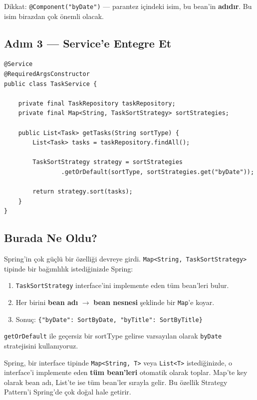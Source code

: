 \documentclass[11pt,a4paper]{article}
\begin{document}
Dikkat: \texttt{@Component("byDate")} --- parantez i\c{c}indeki isim, bu bean'in \textbf{ad{\i}d{\i}r}. Bu isim birazdan \c{c}ok \"{o}nemli olacak.

\subsection*{Ad{\i}m 3 --- Service'e Entegre Et}

\begin{lstlisting}[style=java]
@Service
@RequiredArgsConstructor
public class TaskService {

    private final TaskRepository taskRepository;
    private final Map<String, TaskSortStrategy> sortStrategies;

    public List<Task> getTasks(String sortType) {
        List<Task> tasks = taskRepository.findAll();

        TaskSortStrategy strategy = sortStrategies
                .getOrDefault(sortType, sortStrategies.get("byDate"));

        return strategy.sort(tasks);
    }
}
\end{lstlisting}

\subsection*{Burada Ne Oldu?}

Spring'in \c{c}ok g\"{u}\c{c}l\"{u} bir \"{o}zelli\u{g}i devreye girdi. \texttt{Map<String, TaskSortStrategy>} tipinde bir ba\u{g}{\i}ml{\i}l{\i}k istedi\u{g}inizde Spring:

\begin{enumerate}
    \item \texttt{TaskSortStrategy} interface'ini implemente eden t\"{u}m bean'leri bulur.
    \item Her birini \textbf{bean ad{\i}} $\rightarrow$ \textbf{bean nesnesi} \c{s}eklinde bir \texttt{Map}'e koyar.
    \item Sonu\c{c}: \texttt{\{"byDate": SortByDate, "byTitle": SortByTitle\}}
\end{enumerate}

\texttt{getOrDefault} ile ge\c{c}ersiz bir sortType gelirse varsay{\i}lan olarak \texttt{byDate} stratejisini kullan{\i}yoruz.

\begin{infobox}[title={\textbf{Spring'in Map Injection Mekanizmas{\i}}}]
Spring, bir interface tipinde \texttt{Map<String, T>} veya \texttt{List<T>} istedi\u{g}inizde, o interface'i implemente eden \textbf{t\"{u}m bean'leri} otomatik olarak toplar. Map'te key olarak bean ad{\i}, List'te ise t\"{u}m bean'ler s{\i}rayla gelir. Bu \"{o}zellik Strategy Pattern'i Spring'de \c{c}ok do\u{g}al hale getirir.
\end{infobox}
\end{document}
